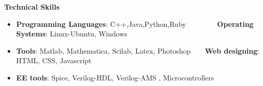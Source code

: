 \documentclass[a4paper,10pt]{article}
\newcommand{\resheading}[1]{{\small \colorbox{mygrey}{\begin{minipage}{0.975\textwidth}{\textbf{#1 \vphantom{p\^{E}}}}\end{minipage}}}}
\begin{document}
\resheading{\textbf{\large Technical Skills}}
\begin{itemize}
  \item \textbf{Programming Languages}: C++,Java,Python,Ruby \  \ \ \ \ \ \ \  \textbf{Operating Systems}: Linux-Ubuntu, Windows\\[-0.6cm]
  \item \textbf{Tools}: Matlab, Mathematica, Scilab, Latex, Photoshop\ \ \ \  \textbf{Web designing}: HTML, CSS, Javascript\\[-0.6cm]
  \item \textbf{EE tools}: Spice, Verilog-HDL, Verilog-AMS , Microcontrollers
\end{itemize}
\end{document}

